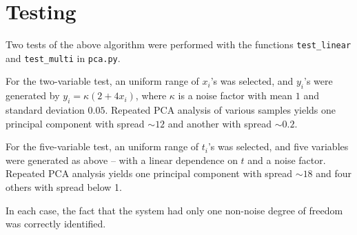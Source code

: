 \documentclass{article}
\theoremstyle{definition}
\begin{document}
\section{Testing}

Two tests of the above algorithm were performed with the functions
\texttt{test_linear} and \texttt{test_multi} in \texttt{pca.py}.

For the two-variable test, an uniform range of $x_i$'s was selected,
and $y_i$'s were generated by $y_i = \kappa (2 + 4x_i)$, where $\kappa$
is a noise factor with mean $1$ and standard deviation $0.05$.
Repeated PCA analysis of various samples yields one principal component
with spread $\sim 12$ and another with spread $\sim 0.2$.

For the five-variable test, an uniform range of $t_i$'s was selected,
and five variables were generated as above -- with a linear dependence
on $t$ and a noise factor. Repeated PCA analysis yields one principal
component with spread $\sim 18$ and four others with spread below 1.

In each case, the fact that the system had only one non-noise degree
of freedom was correctly identified.
\end{document}
